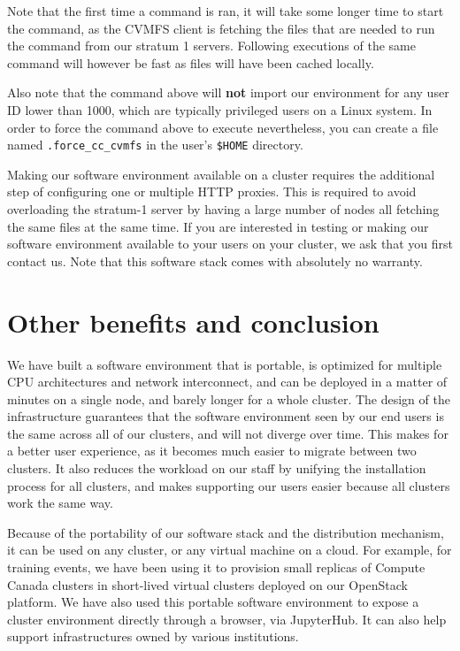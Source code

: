 \documentclass[sigconf]{acmart}
\begin{document}
Note that the first time a command is ran, it will take some longer time to start the command, as the CVMFS client is fetching the files that are needed to run the command from our stratum 1 servers. Following executions of the same command will however be fast as files will have been cached locally. 

Also note that the command above will \textbf{not} import our environment for any user ID lower than 1000, which are typically privileged users on a Linux system. In order to force the command above to execute nevertheless, you can create a file named \verb!.force_cc_cvmfs! in the user's \verb!$HOME! directory. 

Making our software environment available on a cluster requires the additional step of configuring one or multiple HTTP proxies. This is required to avoid overloading the stratum-1 server by having a large number of nodes all fetching the same files at the same time. If you are interested in testing or making our software environment available to your users on your cluster, we ask that you first contact us. Note that this software stack comes with absolutely no warranty. 

\section{Other benefits and conclusion}
\label{sec:Conclusion}
We have built a software environment that is portable, is optimized for multiple CPU architectures and network interconnect, and can be deployed in a matter of minutes on a single node, and barely longer for a whole cluster. The design of the infrastructure guarantees that the software environment seen by our end users is the same across all of our clusters, and will not diverge over time. This makes for a better user experience, as it becomes much easier to migrate between two clusters. It also reduces the workload on our staff by unifying the installation process for all clusters, and makes supporting our users easier because all clusters work the same way.

Because of the portability of our software stack and the distribution mechanism, it can be used on any cluster, or any virtual machine on a cloud. For example, for training events, we have been using it to provision small replicas of Compute Canada clusters in short-lived virtual clusters deployed on our OpenStack platform. We have also used this portable software environment to expose a cluster environment directly through a browser, via JupyterHub. It can also help support infrastructures owned by various institutions.
\end{document}
